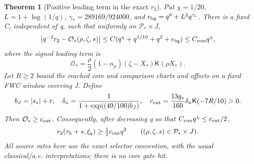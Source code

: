 \documentclass[11pt]{article}
\newtheorem{theorem}{Theorem}[section]
\newcommand{\kf}{\mathsf K}
\begin{document}
\begin{theorem}[Positive leading term in the exact \(r_2\)]
\label{an01bcv1:obstructiontheorem}
Put \(\chi=1/20\), \(L=1+\log(1/q)\),
\(\gamma_*=289169/924000\), and
\(\epsilon_{\rm bg}=q^8+L^2q^{\gamma_*}\).
There is a fixed C, independent of q, such that uniformly on
\(\mathcal P_*\times J\),
\begin{equation}
 \left|q^{-2}r_2-\mathcal O_*(\rho,\zeta,s)\right|
 \le C(q^\chi+q^{1/10}+q^2+\epsilon_{\rm bg})
 \le C_{\rm rem}q^\chi,
 \label{an01bcv1:r2limit}
\end{equation}
where the signed leading term is
\begin{equation}
 \mathcal O_*=\frac{\rho}{2}(1-n_\rho)
                 (\zeta-X_*)\kf(\rho X_*).
 \label{an01bcv1:Ostar}
\end{equation}
Let \(R\ge2\) bound the reached core and comparison charts and offsets
on a fixed FWC window covering J. Define
\begin{equation}
 b_J=|s_*|+r,\quad
 \delta_n=\frac1{1+\exp((49/100)b_J)},\quad
 c_{\rm out}=\frac{13g_*}{160}\delta_n\kf(-7R/10)>0.
 \label{an01bcv1:cout}
\end{equation}
Then \(\mathcal O_*\ge c_{\rm out}\). Consequently, after decreasing
q so that \(C_{\rm rem}q^\chi\le c_{\rm out}/2\),
\begin{equation}
 r_2(\tau_h+s,\xi_q)\ge\tfrac12 c_{\rm out}q^2
 \qquad ((\rho,\zeta,s)\in\mathcal P_*\times J).
 \label{an01bcv1:r2lower}
\end{equation}
All source rates here use the exact selector convention, with the
usual classical/a.e. interpretations; there is no core gate hit.
\end{theorem}
\end{document}

